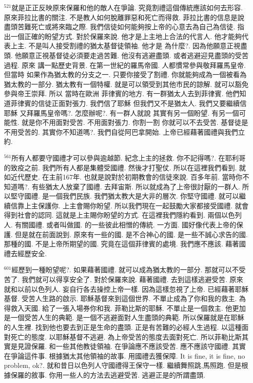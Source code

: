 \documentclass{book}
\begin{document}
$^{521}$就是正正反映原來保羅和他的敵人在爭論.
究竟割禮這個傳統應該如何去形容.
原來菲拉比書的關注.
不是教人如何脫離罪惡和死亡而得救.
菲拉比書的信息是說盡頭苦難死亡或將來臨之際.
我們信徒如何能夠按上帝的心意去為自己為信徒.
指出一個正確的盼望方式.
對於保羅來說.
他才是上主地上合法的代言人.
他才能夠代表上主.
不是叫人接受割禮的猶太基督徒領袖.
他才是 為什麼?.
因為他願意正視盡頭.
他願意正視基督徒必須要走過苦難.
他沒有逃避盡頭.
或者逃避迎見盡頭的受苦過程.
原來 講一點歷史背景.
在第一世紀的羅馬帝國.
人都慣常參與敬拜羅馬皇帝.
但當時 如果作為猶太教的分支之一.
只要你接受了割禮.
你就能夠成為一個被看為猶太教的一部分.
猶太教有一個特權.
就是可以領受到其他市民的諒解.
就可以豁免參與帝王崇拜.
所以 當時在歐洲 菲律賓的地方.
有一群猶太人去到菲律賓.
他們知道菲律賓的信徒正面對張力.
我們信了耶穌 但我們又不是猶太人.
我們又要繼續信耶穌 又拜羅馬皇帝嗎?.
怎麼辦呢?.
有一群人就說 其實有另一個盼望.
有另一個可能性.
就是你不用面對受苦.
不用面對張力.
你割一割 你就可以不去受苦.
基督徒是不用受苦的.
其實你不知道嗎?.
我們自從阿巴拿開始.
上帝已經藉著國禮與我們立約.

$^{561}$所有人都要守國禮才可以參與逾越節.
紀念上主的拯救.
你不記得嗎?.
在耶利哥的致疫之前.
我們所有人都是集體受國禮.
然後才打聖仗.
所以在這裡我們看到.
就如近代歷史.
在主前167年.
也就是說對於初期教會的信徒來說.
百多年前.
當時你不知道嗎?.
有些猶太人放棄了國禮.
去拜宙斯.
所以就成為了上帝很討厭的一群人.
所以堅守國禮.
是一個我們民族.
我們猶太教大是大非的層次.
你堅守國禮.
就可以繼續信靠上主保護你.
上主會賜你盼望.
所以我們現在一起鼓勵大家都接受國禮.
就會得到社會的認同.
這就是上主賜你盼望的方式.
在這裡我們隱約看到.
兩個以色列人.
有關國禮.
或者叫做國.
的一些彼此相憎的傳統.
一方面.
國好像代表上帝的保護.
但是就在前面說到.
原來有一些的國.
是不合神心的國.
是一些不誠心求告的國.
那種的國.
不是上帝所期望的國.
究竟在這個菲律賓的處境.
我們應不應該.
藉著國禮去經歷安全.

$^{601}$經歷到一種盼望呢?.
如果藉著國禮.
就可以成為猶太教的一部分.
那就可以不受苦了.
我們就可以得享安全了.
對於保羅來說.
藉著國禮.
去到這樣逃避受苦.
原來就和以前以色列人.
妄自行各去操控上帝一樣.
因為這樣忽視了上帝.
已經藉著耶穌基督.
受苦人生路的啟示.
耶穌基督來到這個世界.
不單止成為了你和我的救主.
為得救入天國.
給了一張入場券你和我.
菲勒比斯的耶穌.
不單止是一個救主.
他更加是一個受苦人生的典範.
是一個不逃避面對人生盡頭的典範.
所以保羅就是在耶穌的人生裡.
找到他也要去到正是生命的盡頭.
正是有苦難的必經人生過程.
以這種面對死亡的態度.
以耶穌基督不逃避.
為上帝受苦的態度去面對死亡.
所以菲勒比斯其實是見證保羅.
和一些其他教徒領袖.
在爭論應不應該受苦.
應不應該守國禮.
其實在爭論這件事.
根據猶太其他領袖的故事.
用國禮去獲保障.
It is fine, it is fine, no problem, ok?.
就和昔日以色列人守國禮得王保守一樣.
繼續舞照跳,馬照跑.
但是根據保羅的敘事.
你用一些人的方法去逃避受苦.
逃避正是的所謂盡頭.
\end{document}

